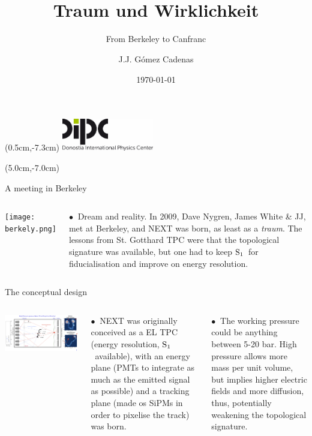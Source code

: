 \documentclass [aspectratio=169]{beamer}
\title[]{\vspace{60pt} \\
Traum und Wirklichkeit} %
\subtitle{From Berkeley to Canfranc}
\author[]{J.J. Gómez Cadenas}
\institute[]{Donostia International Physics Center}
\date{\today}
\newcommand{\so}{\ensuremath{\rm S_1}}
\begin{document}
{
\begin{frame}
    \titlepage
    \begin{textblock*}{4cm}(0.5cm,-7.3cm)
        \includegraphics[width=4cm]{dipc.png}
    \end{textblock*}
    \begin{textblock*}{8cm}(5.0cm,-7.0cm)
        \huge {} %
    \end{textblock*}
\end{frame}
}

\begin{frame}{A meeting in Berkeley}

\begin{columns}
\texttt{[image: berkely.png]}


$\bullet~$ Dream and reality. In 2009, Dave Nygren, James White \& JJ, met at Berkeley, and NEXT was born, as least as a {\em traum}. The lessons from St. Gotthard TPC were that the topological signature was available, but one had to keep \so\ for fiducialisation and improve on energy resolution.    

\end{columns}
\end{frame}


\begin{frame}{The conceptual design}

\begin{columns}
\includegraphics[scale=0.14]{nexttraum.png}


$\bullet~$ NEXT  was originally conceived as a EL TPC (energy resolution, \so\ available), with an energy plane (PMTs to integrate as much as the emitted signal as possible) and a tracking plane (made os SiPMs in order to pixelise the track) was born.  

$\bullet~$ The working pressure could be anything between 5-20 bar. High pressure allows more mass per unit volume, but implies higher electric fields and more diffusion, thus, potentially weakening the topological signature. 

\end{columns}
\end{frame}
\end{document}
